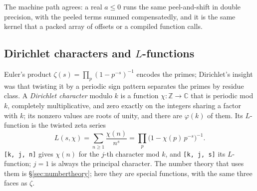 \begin{codepairs}
\end{codepairs}

The machine path agrees: a real \(a\le0\) runs the same peel-and-shift in double
precision, with the peeled terms summed compensatedly, and it is the same kernel that
a packed array of offsets or a compiled function calls.

\subsection{Dirichlet characters and \texorpdfstring{\(L\)}{L}-functions}
\label{ssec:sf-dirichlet}

Euler's product \(\zeta(s)=\prod_p(1-p^{-s})^{-1}\) encodes the primes; Dirichlet's
insight was that twisting it by a periodic sign pattern separates the primes by
residue class. A \emph{Dirichlet character} modulo \(k\) is a function
\(\chi:\mathbb Z\to\mathbb C\) that is periodic mod \(k\), completely multiplicative,
and zero exactly on the integers sharing a factor with \(k\); its nonzero values are
roots of unity, and there are \(\varphi(k)\) of
them. Its \(L\)-function is the twisted zeta
series
\[
  L(s,\chi)=\sum_{n\ge1}\frac{\chi(n)}{n^{s}}=\prod_p\bigl(1-\chi(p)\,p^{-s}\bigr)^{-1}.
\]
\texttt{[k, j, n]} gives \(\chi(n)\) for the \(j\)-th character
mod \(k\), and \texttt{[k, j, s]} its \(L\)-function; \(j=1\) is
always the principal character. The number theory that uses them is
\S\ref{sec:numbertheory}; here they are special functions, with the same three faces
as \(\zeta\).

